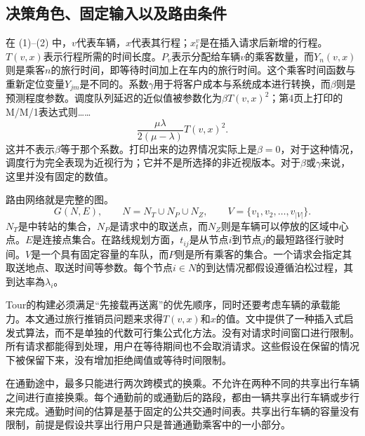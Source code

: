 \documentclass{article}
\begin{document}
\subsection*{决策角色、固定输入以及路由条件}
在 (1)–(2) 中，$v$代表车辆，$x$代表其行程；$x_t^v$是在插入请求后新增的行程。$T(v,x)$表示行程所需的时间长度。$P_v$表示分配给车辆$v$的乘客数量，而$Y_n(v,x)$则是乘客$n$的旅行时间，即等待时间加上在车内的旅行时间。这个乘客时间函数与重新定位变量$Y_{jm}$是不同的。系数$\gamma$用于将客户成本与系统成本进行转换，而$\beta$则是预测程度参数。调度队列延迟的近似值被参数化为$\beta T(v,x)^2$；第4页上打印的M/M/1表达式则……
\[
\frac{\mu\lambda}{2(\mu-\lambda)}T(v,x)^2.
\]
这并不表示$\beta$等于那个系数。打印出来的边界情况实际上是$\beta=0$，对于这种情况，调度行为完全表现为近视行为；它并不是所选择的非近视版本。对于$\beta$或$\gamma$来说，这里并没有固定的数值。

路由网络就是完整的图。
\[
G(N,E),\qquad N=N_T\cup N_P\cup N_Z,
\qquad V=\{v_1,v_2,\ldots,v_{|V|}\}.
\]
$N_T$是中转站的集合，$N_P$是请求中的取送点，而$N_Z$则是车辆可以停放的区域中心点。$E$是连接点集合。在路线规划方面，$t_{ij}$是从节点$i$到节点$j$的最短路径行驶时间。$V$是一个具有固定容量的车队，而$P$则是所有乘客的集合。一个请求会指定其取送地点、取送时间等参数。每个节点$i\in N$的到达情况都假设遵循泊松过程，其到达率為$\lambda_i$。

Tour的构建必须满足“先接载再送离”的优先顺序，同时还要考虑车辆的承载能力。本文通过旅行推销员问题来求得$T(v,x)$和$x$的值。文中提供了一种插入式启发式算法，而不是单独的代数可行集公式化方法。没有对请求时间窗口进行限制。所有请求都能得到处理，用户在等待期间也不会取消请求。这些假设在保留的情况下被保留下来，没有增加拒绝阈值或等待时间限制。

在通勤途中，最多只能进行两次跨模式的换乘。不允许在两种不同的共享出行车辆之间进行直接换乘。每个通勤前的或通勤后的路段，都由一辆共享出行车辆或步行来完成。通勤时间的估算是基于固定的公共交通时间表。共享出行车辆的容量没有限制，前提是假设共享出行用户只是普通通勤乘客中的一小部分。
\end{document}
